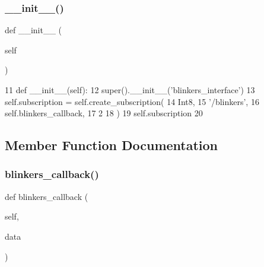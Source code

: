 \subsubsection{\texorpdfstring{\+\_\+\+\_\+init\+\_\+\+\_\+()}{\_\_init\_\_()}}
{\footnotesize\ttfamily def \+\_\+\+\_\+init\+\_\+\+\_\+ (\begin{DoxyParamCaption}\item[{}]{self }\end{DoxyParamCaption})}


\begin{DoxyCode}
11     \textcolor{keyword}{def }\_\_init\_\_(self):
12         super().\_\_init\_\_(\textcolor{stringliteral}{'blinkers\_interface'})
13         self.subscription = self.create\_subscription(
14                 Int8,
15                 \textcolor{stringliteral}{'/blinkers'},
16                 self.blinkers\_callback,
17                 2
18                 )
19         self.subscription
20 
\end{DoxyCode}


\subsection{Member Function Documentation}
\mbox{\label{classtoxic__hardware_1_1blinkers__interface_1_1BlinkersInterface_a74f43bc48b49ce4860b4fe27ab96fdda}} 
\subsubsection{\texorpdfstring{blinkers\+\_\+callback()}{blinkers\_callback()}}
{\footnotesize\ttfamily def blinkers\+\_\+callback (\begin{DoxyParamCaption}\item[{}]{self,  }\item[{}]{data }\end{DoxyParamCaption})}


